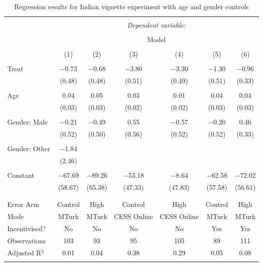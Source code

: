 
\begin{sidewaystable}[!htbp] \centering
\begin{tabular}{@{\extracolsep{5pt}}lcccccc}
\\[-1.8ex]\hline
\hline \\[-1.8ex]
 & \multicolumn{6}{c}{\textit{Dependent variable:}} \\
\cline{2-7}
\\[-1.8ex] & \multicolumn{6}{c}{Model} \\
\\[-1.8ex] & (1) & (2) & (3) & (4) & (5) & (6)\\
\hline \\[-1.8ex]
 Treat & $-$0.73 & $-$0.68 & $-$3.80 & $-$3.30 & $-$1.30 & $-$0.96 \\
  & (0.48) & (0.48) & (0.51) & (0.49) & (0.51) & (0.33) \\
  & & & & & & \\
 Age & 0.04 & 0.05 & 0.03 & 0.01 & 0.04 & 0.04 \\
  & (0.03) & (0.03) & (0.02) & (0.02) & (0.03) & (0.03) \\
  & & & & & & \\
 Gender: Male & $-$0.21 & $-$0.49 & 0.55 & $-$0.57 & $-$0.20 & 0.46 \\
  & (0.52) & (0.50) & (0.56) & (0.52) & (0.52) & (0.33) \\
  & & & & & & \\
 Gender: Other & $-$1.84 &  &  &  &  &  \\
  & (2.46) &  &  &  &  &  \\
  & & & & & & \\
 Constant & $-$67.69 & $-$89.26 & $-$53.18 & $-$8.64 & $-$62.58 & $-$72.02 \\
  & (58.67) & (65.38) & (47.33) & (47.83) & (57.58) & (56.61) \\
  & & & & & & \\
\hline \\[-1.8ex]
Error Arm & Control & High & Control & High & Control & High \\
Mode & MTurk & MTurk & CESS Online & CESS Online & MTurk & MTurk \\
Incentivised? & No & No & No & No & Yes & Yes \\
Observations & 103 & 93 & 95 & 105 & 89 & 111 \\
Adjusted R$^{2}$ & 0.01 & 0.04 & 0.38 & 0.29 & 0.05 & 0.08 \\
\hline
\hline \\[-1.8ex]
\end{tabular}
\caption{Regression results for Indian vignette experiment with age and gender controls}
\label{tab:india_robust} 
\end{sidewaystable}
